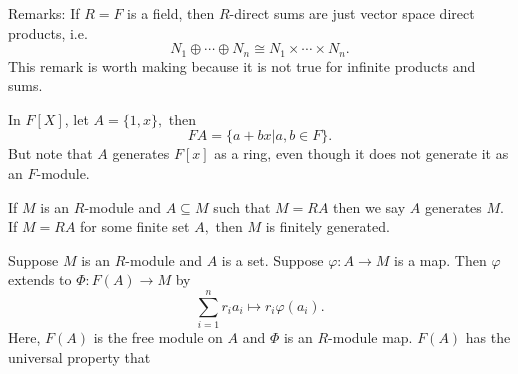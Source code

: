 \documentclass{article}
\numberwithin{equation}{section}
\begin{document}
Remarks: If $R=F$ is a field, then $R$-direct sums are just vector space direct products, i.e. 
\begin{equation}
    N_1 \oplus \cdots \oplus N_n \cong N_1 \times \cdots \times N_n.
\end{equation}
This remark is worth making because it is not true for infinite products and sums.
\begin{example}
    In $F[X]$, let $A=\{1,x\},$ then 
    \begin{equation}
        FA = \{a+bx | a,b\in F\}.
    \end{equation}
    But note that $A$ generates $F[x]$ as a ring, even though it does not generate it as an $F$-module.
\end{example}
If $M$ is an $R$-module and $A\subseteq M$ such that $M=RA$ then we say $A$ generates $M$. If $M=RA$ for some finite set $A,$ then $M$ is finitely generated.

Suppose $M$ is an $R$-module and $A$ is a set. Suppose $\varphi: A\to M$ is a map. Then $\varphi$ extends to $\Phi:F(A) \to M$ by 
\begin{equation}
    \sum_{i=1}^n r_ia_i \mapsto r_i\varphi(a_i).
\end{equation}
Here, $F(A)$ is the free module on $A$ and $\Phi$ is an $R$-module map. $F(A)$ has the universal property that 
\end{document}
